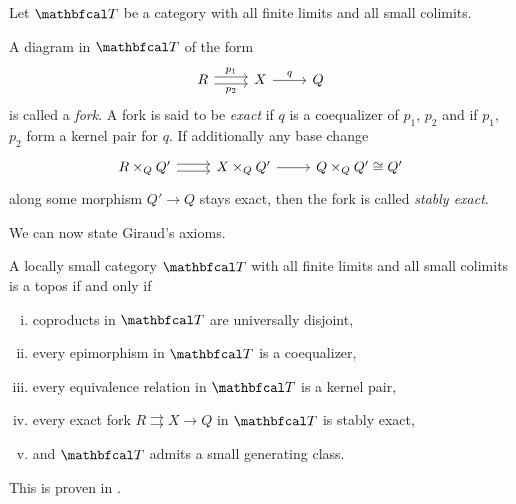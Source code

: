 \begin{definition}
	Let $\category T$ be a category with all finite limits and all small colimits.
	
	A diagram in $\category{T}$ of the form
		$$\begin{tikzcd}
			R\ar[r, "p_1", shift left=.25em]\ar[r, "p_2", shift right=.25em, swap] &X \ar[r, "q"] &Q
		\end{tikzcd}$$
	is called a \emph{fork}. A fork is said to be \emph{exact} if $q$ is a coequalizer of $p_1$, $p_2$ and if $p_1$, $p_2$ form a kernel pair for $q$. If additionally any base change
		$$\begin{tikzcd}
			R\times_Q Q' \ar[r, shift left=.25em]\ar[r, shift right=.25em] &X\times_Q Q' \ar[r] &Q \times_Q Q'\cong Q'
		\end{tikzcd}$$
	along some morphism $Q'\to Q$ stays exact, then the fork is called \emph{stably exact}.
\end{definition}

We can now state Giraud's axioms.
\begin{theorem}
	\label{theorem: girauds axioms}
	
	A locally small category $\category T$ with all finite limits and all small colimits is a topos if and only if
	\begin{enumerate}[(i)]
		\item
		coproducts in $\category T$ are universally disjoint,
		
		\item
		every epimorphism in $\category T$ is a coequalizer,
		
		\item
		every equivalence relation in $\category T$ is a kernel pair,
		
		\item
		every exact fork $R\rightrightarrows X\to Q$ in $\category T$ is stably exact,
		
		\item
		and $\category T$ admits a small generating class.
	\end{enumerate}
\end{theorem}
\begin{shortproof}
	This is proven in \cite[Appendix §3]{sheaves-in-geometry-and-logic}.
\end{shortproof}


